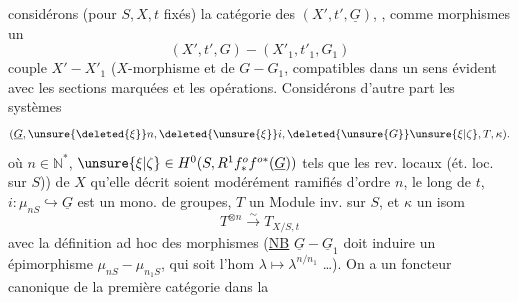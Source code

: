 
considérons (pour $S,X,t$ fixés) la catégorie des $(X',t',\underline G)$,  , comme morphismes un
\[
(X',t',G)\mathbin{-}(X'_1,t'_1,G_1)
\]
 couple  $X'\mathbin{-}X'_1$ ($X$-morphisme et de $G\mathbin{-}G_1$, compatibles dans un sens évident avec les sections marquées et les opérations.
Considérons d'autre part les  systèmes
\[
(\underline G,\unsure{\deleted{\xi}}n,\deleted{\unsure{\xi}}i,\deleted{\unsure{G}}\unsure{\xi|\zeta},T,\kappa).
\]
où  $n\in\mathbb N^*$, $\unsure{\xi|\zeta}\in H^0(S,R^1f^o_*f^{o*}(\underline G))$ tels que les rev. locaux (ét. loc. sur $S$)) de $X$ qu'elle décrit soient modérément ramifiés d'ordre $n$, le long de $t$, $i:\mu_{nS}\hookrightarrow\underline G$ est un mono. de groupes, $T$ un Module inv. sur $S$, et $\kappa$ un isom
\[
T^{\otimes n}\xrightarrow{\sim}T_{X/S,t}
\]
avec la définition ad hoc des morphismes (\uline{NB}  $\underline G\mathbin{-}\underline G_1$ doit induire un épimorphisme $\mu_{nS}\mathbin{-}\mu_{n_1S}$, qui soit l'hom  $\lambda\longmapsto\lambda^{n/n_1}$ \ldots). On a un foncteur canonique de la première catégorie dans la
